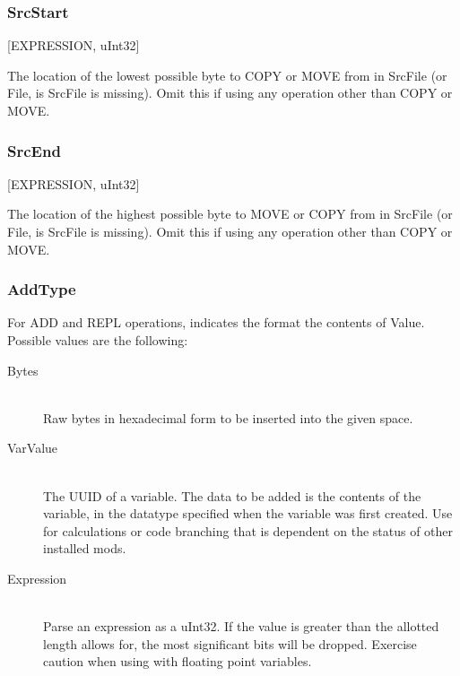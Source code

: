 \documentclass[12pt,a4paper,notitlepage]{article}
\begin{document}
\subsubsection{SrcStart}
[EXPRESSION, uInt32]

The location of the lowest possible byte to COPY or MOVE from in SrcFile (or File, is SrcFile is missing). Omit this if using any operation other than COPY or MOVE.

\subsubsection{SrcEnd}
[EXPRESSION, uInt32]

The location of the highest possible byte to MOVE or COPY from in SrcFile (or File, is SrcFile is missing). Omit this if using any operation other than COPY or MOVE.

\subsubsection{AddType}
For ADD and REPL operations, indicates the format the contents of Value. Possible values are the following:

\begin{description}
\item[Bytes] \hfill \\ 
    Raw bytes in hexadecimal form to be inserted into the given space.
    
    
\item[VarValue] \hfill \\
    The UUID of a variable. The data to be added is the contents of the variable, in the datatype specified when the variable was first created. Use for calculations or code branching that is dependent on the status of other installed mods.

\item[Expression] \hfill \\
    Parse an expression as a uInt32. If the value is greater than the allotted length allows for, the most significant bits will be dropped. Exercise caution when using with floating point variables.

\end{description}
\end{document}
